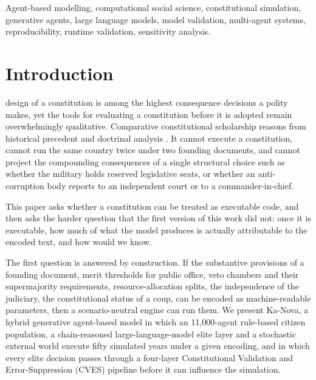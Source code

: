 \documentclass{ieeeaccess}
\begin{document}
\begin{keywords}
Agent-based modelling, computational social science, constitutional
simulation, generative agents, large language models, model validation,
multi-agent systems, reproducibility, runtime validation, sensitivity
analysis.
\end{keywords}

\titlepgskip=-15pt
\maketitle

\section{Introduction}
\label{sec:intro}

 design of a constitution is among the highest
consequence decisions a polity makes, yet the tools for evaluating a
constitution before it is adopted remain overwhelmingly qualitative.
Comparative constitutional scholarship reasons from historical precedent
and doctrinal analysis \cite{acemoglu2012why,lijphart2012patterns,
elkins2009endurance}. It cannot execute a constitution, cannot run the
same country twice under two founding documents, and cannot project the
compounding consequences of a single structural choice such as whether
the military holds reserved legislative seats, or whether an
anti-corruption body reports to an independent court or to a
commander-in-chief.

This paper asks whether a constitution can be treated as executable
code, and then asks the harder question that the first version of this
work did not: once it is executable, how much of what the model produces
is actually attributable to the encoded text, and how would we know.

The first question is answered by construction. If the substantive
provisions of a founding document, merit thresholds for public office,
veto chambers and their supermajority requirements, resource-allocation
splits, the independence of the judiciary, the constitutional status of
a coup, can be encoded as machine-readable parameters, then a
scenario-neutral engine can run them. We present Ka-Nova, a hybrid
generative agent-based model in which an 11,000-agent rule-based citizen
population, a chain-reasoned large-language-model elite layer and a
stochastic external world execute fifty simulated years under a given
encoding, and in which every elite decision passes through a four-layer
Constitutional Validation and Error-Suppression (CVES) pipeline before
it can influence the simulation.
\end{document}
